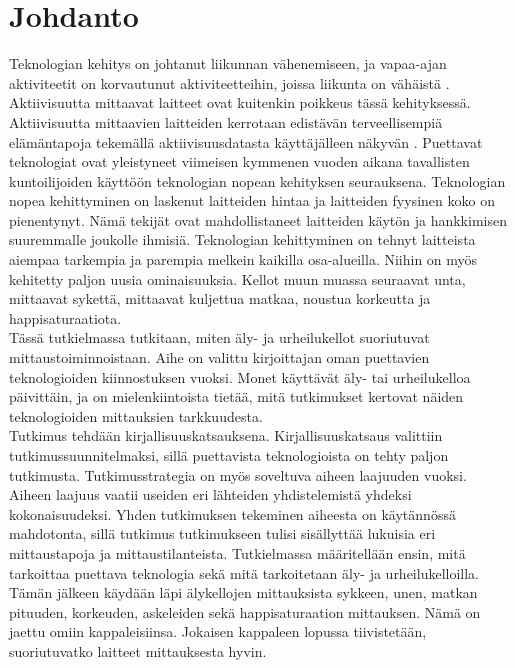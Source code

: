 \documentclass[utf8,bachelor,finnish]{bachelor}
\begin{document}
\chapter{Johdanto}
  Teknologian kehitys on johtanut liikunnan vähenemiseen, ja vapaa-ajan aktiviteetit on korvautunut aktiviteetteihin, joissa liikunta on vähäistä \parencite{petrusevski_interventions_2021}.
   Aktiivisuutta mittaavat laitteet ovat kuitenkin poikkeus tässä kehityksessä. Aktiivisuutta mittaavien laitteiden kerrotaan edistävän terveellisempiä elämäntapoja
    tekemällä aktiivisuusdatasta käyttäjälleen näkyvän \parencite{shin2015understanding}.
     Puettavat teknologiat ovat yleistyneet viimeisen kymmenen vuoden aikana tavallisten kuntoilijoiden käyttöön teknologian nopean kehityksen seurauksena.
      Teknologian nopea kehittyminen on laskenut laitteiden hintaa ja laitteiden fyysinen koko on pienentynyt. Nämä tekijät ovat mahdollistaneet laitteiden käytön ja hankkimisen suuremmalle joukolle ihmisiä.
       Teknologian kehittyminen on tehnyt laitteista aiempaa tarkempia ja parempia melkein kaikilla osa-alueilla. Niihin on myös kehitetty paljon uusia ominaisuuksia.
        Kellot muun muassa seuraavat unta, mittaavat sykettä, mittaavat kuljettua matkaa, noustua korkeutta ja happisaturaatiota.\\

  Tässä tutkielmassa tutkitaan, miten äly- ja urheilukellot suoriutuvat mittaustoiminnoistaan.
   Aihe on valittu kirjoittajan oman puettavien teknologioiden kiinnostuksen vuoksi. Monet käyttävät äly- tai urheilukelloa päivittäin, ja on mielenkiintoista tietää, mitä tutkimukset kertovat
    näiden teknologioiden mittauksien tarkkuudesta. \\
    
  Tutkimus tehdään kirjallisuuskatsauksena. Kirjallisuuskatsaus valittiin tutkimussuunnitelmaksi, sillä puettavista teknologioista on tehty paljon tutkimusta.
   Tutkimusstrategia on myös soveltuva aiheen laajuuden vuoksi. Aiheen laajuus vaatii useiden eri lähteiden yhdistelemistä yhdeksi kokonaisuudeksi. Yhden tutkimuksen tekeminen aiheesta on käytännössä mahdotonta,
    sillä tutkimus tutkimukseen tulisi sisällyttää lukuisia eri mittaustapoja ja mittaustilanteista. Tutkielmassa määritellään ensin, mitä tarkoittaa puettava teknologia
     sekä mitä tarkoitetaan äly- ja urheilukelloilla. Tämän jälkeen käydään läpi älykellojen mittauksista sykkeen, unen, matkan pituuden, korkeuden, askeleiden sekä
      happisaturaation mittauksen. Nämä on jaettu omiin kappaleisiinsa. Jokaisen kappaleen lopussa tiivistetään, suoriutuvatko laitteet mittauksesta hyvin.
\end{document}

